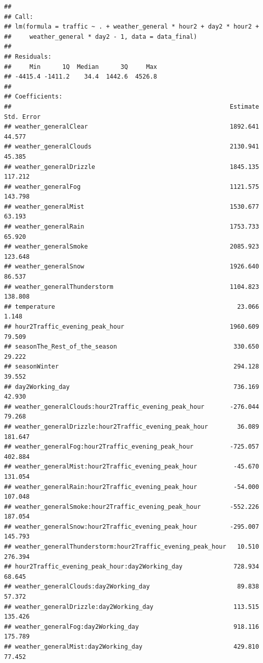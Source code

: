 \documentclass[
]{article}
\begin{document}
\begin{verbatim}
## 
## Call:
## lm(formula = traffic ~ . + weather_general * hour2 + day2 * hour2 + 
##     weather_general * day2 - 1, data = data_final)
## 
## Residuals:
##     Min      1Q  Median      3Q     Max 
## -4415.4 -1411.2    34.4  1442.6  4526.8 
## 
## Coefficients:
##                                                            Estimate Std. Error
## weather_generalClear                                       1892.641     44.577
## weather_generalClouds                                      2130.941     45.385
## weather_generalDrizzle                                     1845.135    117.212
## weather_generalFog                                         1121.575    143.798
## weather_generalMist                                        1530.677     63.193
## weather_generalRain                                        1753.733     65.920
## weather_generalSmoke                                       2085.923    123.648
## weather_generalSnow                                        1926.640     86.537
## weather_generalThunderstorm                                1104.823    138.808
## temperature                                                  23.066      1.148
## hour2Traffic_evening_peak_hour                             1960.609     79.509
## seasonThe_Rest_of_the_season                                330.650     29.222
## seasonWinter                                                294.128     39.552
## day2Working_day                                             736.169     42.930
## weather_generalClouds:hour2Traffic_evening_peak_hour       -276.044     79.268
## weather_generalDrizzle:hour2Traffic_evening_peak_hour        36.089    181.647
## weather_generalFog:hour2Traffic_evening_peak_hour          -725.057    402.884
## weather_generalMist:hour2Traffic_evening_peak_hour          -45.670    131.054
## weather_generalRain:hour2Traffic_evening_peak_hour          -54.000    107.048
## weather_generalSmoke:hour2Traffic_evening_peak_hour        -552.226    187.054
## weather_generalSnow:hour2Traffic_evening_peak_hour         -295.007    145.793
## weather_generalThunderstorm:hour2Traffic_evening_peak_hour   10.510    276.394
## hour2Traffic_evening_peak_hour:day2Working_day              728.934     68.645
## weather_generalClouds:day2Working_day                        89.838     57.372
## weather_generalDrizzle:day2Working_day                      113.515    135.426
## weather_generalFog:day2Working_day                          918.116    175.789
## weather_generalMist:day2Working_day                         429.810     77.452

\end{verbatim}
\end{document}
